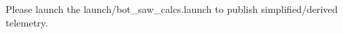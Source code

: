Please launch the {\ttfamily launch/bot\+\_\+saw\+\_\+calcs.\+launch} to publish simplified/derived telemetry. 